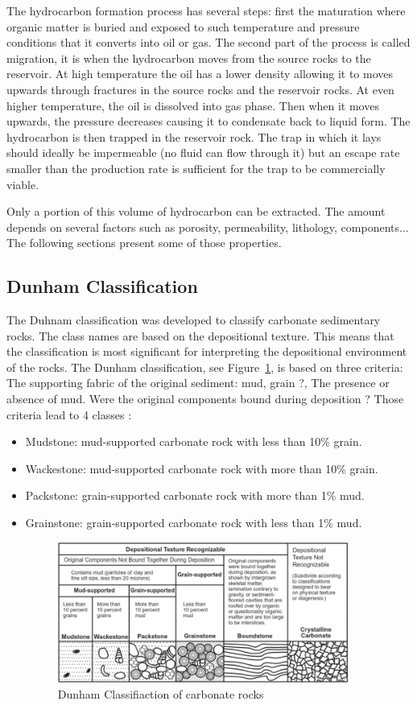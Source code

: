 The hydrocarbon formation process has several steps: first the maturation where organic matter is buried and exposed to such temperature and pressure conditions that it converts into oil or gas. The second part of the process is called migration, it is when the hydrocarbon moves from the source rocks to the reservoir. At high temperature the oil has a lower density allowing it to moves upwards through fractures in the source rocks and the reservoir rocks. At even higher temperature, the oil is dissolved into gas phase. Then when it moves upwards, the pressure decreases causing it to condensate back to liquid form. The hydrocarbon is then trapped in the reservoir rock. The trap in which it lays should ideally be impermeable (no fluid can flow through it) but an escape rate smaller than the production rate is sufficient for the trap to be commercially viable. 

Only a portion of this volume of hydrocarbon can be extracted. The amount depends on several factors such as porosity, permeability, lithology, components...  The following sections present some of those properties. 
\subsection{Dunham Classification}
The Duhnam classification was developed to classify carbonate sedimentary rocks. The class names are based on the depositional texture. This means that the classification is most significant for interpreting the depositional environment of the rocks. The Dunham classification, see Figure~\ref{fig:dunham}, is based on three criteria: The supporting fabric of the original sediment: mud, grain ?, The presence or absence of mud. Were the original components bound during deposition ?
Those criteria lead to 4 classes :
\begin{itemize}
    \item Mudstone: mud-supported carbonate rock with less than 10\% grain.
    \item Wackestone: mud-supported carbonate rock with more than 10\% grain.
    \item Packstone: grain-supported carbonate rock with more than 1\% mud.
    \item Grainstone: grain-supported carbonate rock with less than 1\% mud.
	\begin{figure}[!htp]
    \centering
        \includegraphics[width=0.9\textwidth]{./figures/02-Dunhams-classification}
        \caption{Dunham Classifiaction of carbonate rocks}\label{fig:dunham}
    \end{figure}
\end{itemize}

